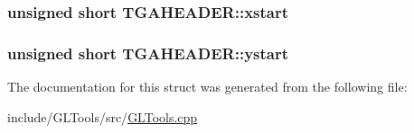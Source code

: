 \hypertarget{struct_t_g_a_h_e_a_d_e_r_a401e8bd5c99a9b4eb1f2870fb7798451}{
\subsubsection[{xstart}]{\setlength{\rightskip}{0pt plus 5cm}unsigned short T\-G\-A\-H\-E\-A\-D\-E\-R\-::xstart}}\label{struct_t_g_a_h_e_a_d_e_r_a401e8bd5c99a9b4eb1f2870fb7798451}
\hypertarget{struct_t_g_a_h_e_a_d_e_r_a5764ddc4d61823db8ad1d4d52a7fa271}{
\subsubsection[{ystart}]{\setlength{\rightskip}{0pt plus 5cm}unsigned short T\-G\-A\-H\-E\-A\-D\-E\-R\-::ystart}}\label{struct_t_g_a_h_e_a_d_e_r_a5764ddc4d61823db8ad1d4d52a7fa271}


The documentation for this struct was generated from the following file\-:\begin{DoxyCompactItemize}
\item 
include/\-G\-L\-Tools/src/\hyperlink{_g_l_tools_8cpp}{G\-L\-Tools.\-cpp}\end{DoxyCompactItemize}
